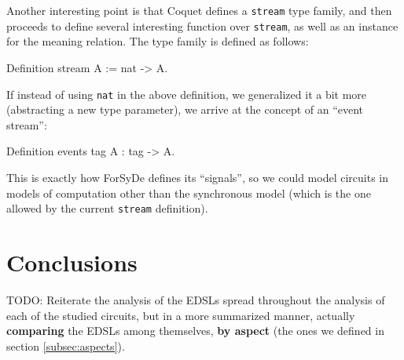 \documentclass[a4paper]{article}
\begin{document}
                Another interesting point is that Coquet defines a \texttt{stream} type family, and
                then proceeds to define several interesting function over \texttt{stream}, as well
                as an instance for the meaning relation. The type family is defined as follows:

                \begin{coqcode}
        Definition stream A := nat -> A.
                \end{coqcode}

                If instead of using \texttt{nat} in the above definition, we generalized it a bit
                more (abstracting a new type parameter), we arrive at the concept of an ``event
                stream'':
                \begin{coqcode}
        Definition events tag A : tag -> A.
                \end{coqcode}
                This is exactly how ForSyDe defines its ``signals'', so we could model circuits in
                models of computation other than the synchronous model (which is the one allowed by
                the current \texttt{stream} definition).



    \section{Conclusions}
    \label{sec:conclusions}
        TODO: Reiterate the analysis of the EDSLs spread throughout the analysis of each of the
        studied circuits, but in a more summarized manner, actually \textbf{comparing} the EDSLs
        among themselves, \textbf{by aspect} (the ones we defined in section \ref{subsec:aspects}).


    
    
\end{document}
